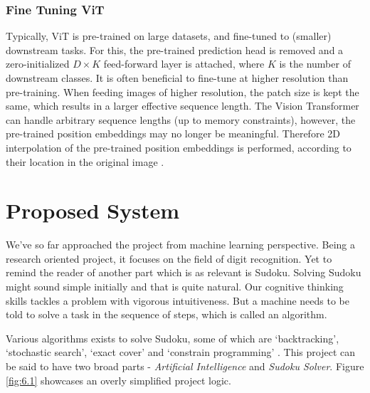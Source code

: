 \documentclass[12pt, a4paper]{report}
\begin{document}
\subsection{Fine Tuning ViT}
\label{subsec:finevit}

\hspace{0.5cm} Typically, ViT is pre-trained on large datasets, and fine-tuned to (smaller) downstream tasks. For this, the pre-trained prediction head is removed and a zero-initialized $D\times K$ feed-forward layer is attached, where $K$ is the number of downstream classes. It is often beneficial to fine-tune at higher resolution than pre-training. When feeding images of higher resolution, the patch size is kept the same, which results in a larger effective sequence length. The Vision Transformer can handle arbitrary sequence lengths (up to memory constraints), however, the pre-trained position embeddings may no longer be meaningful. Therefore 2D interpolation of the pre-trained position embeddings is performed, according to their location in the original image \cite{2020arXiv201011929D}.
\vspace*{\fill}

\chapter{Proposed System}
\label{chap:proposed}
\thispagestyle{fancy}

\hspace{0.5cm} We've so far approached the project from machine learning perspective. Being a research oriented project, it focuses on the field of digit recognition. Yet to remind the reader of another part which is as relevant is Sudoku. Solving Sudoku might sound simple initially and that is quite natural. Our cognitive thinking skills tackles a problem with vigorous intuitiveness. But a machine needs to be told to solve a task in the sequence of steps, which is called an algorithm.

Various algorithms exists to solve Sudoku, some of which are `backtracking', `stochastic search', `exact cover' and `constrain programming' \cite{wiki:solvsdkalgo}. This project can be said to have two broad parts - \emph{Artificial Intelligence} and \emph{Sudoku Solver}. Figure \eqref{fig:6.1} showcases an overly simplified project logic.
\end{document}

